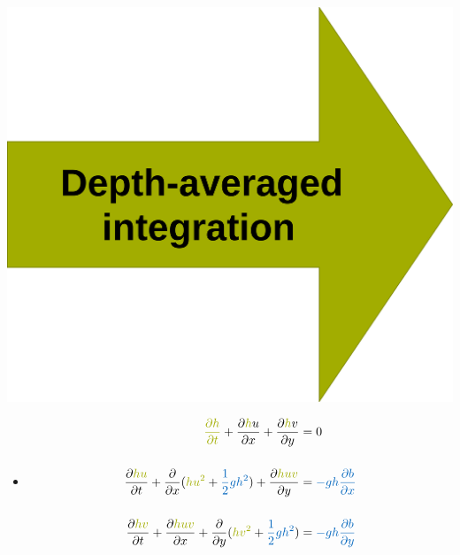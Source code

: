 \begin{frame}
\begin{minipage}{0.15\textwidth}
\begin{itemize}
\includegraphics[width=1.2\textwidth]{Resources/Images/arrow3.png}\\
\end{itemize}           
\end{minipage}
\hspace{1.5cm}
\begin{minipage}{0.4\textwidth}
\begin{itemize}
\item<3->[]
\begin{tcolorbox}[title=SWE model, colback=white] 
\begin{align*}
\myTUMgreen{\frac{\partial h}{\partial t}} + \frac{\partial \myTUMgreen{h}u}{\partial x} + \frac{\partial \myTUMgreen{h}v}{\partial y} &= 0\\[0.5cm]
\frac{\partial \myTUMgreen{hu}}{\partial t} + \frac{\partial}{\partial x}(\myTUMgreen{hu^2} + \myTUMdarkblue{\frac{1}{2} g h^2}) + \frac{\partial \myTUMgreen{huv}}{\partial y} &= \myTUMdarkblue{- gh\frac{\partial b}{\partial x}} \\[0.5cm]
\frac{\partial \myTUMgreen{hv}}{\partial t} + \frac{\partial \myTUMgreen{huv}}{\partial x} + \frac{\partial}{\partial y}(\myTUMgreen{hv^2} + \myTUMdarkblue{\frac{1}{2} g h^2})&= \myTUMdarkblue{- gh\frac{\partial b}{\partial y} }
\end{align*}
\end{tcolorbox}
\end{itemize}
\end{minipage}
\end{frame}
\clearpage


